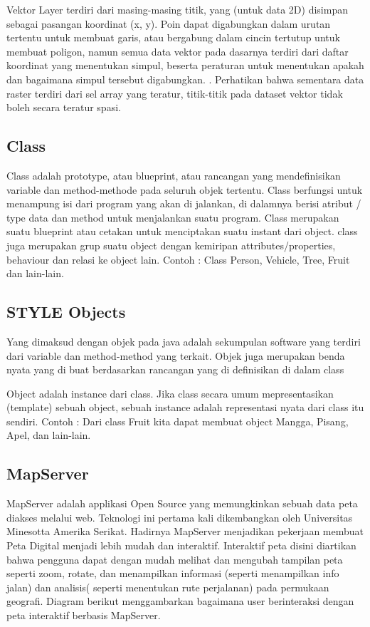 Vektor Layer terdiri dari masing-masing titik, yang (untuk data 2D) disimpan sebagai pasangan koordinat (x, y). 
Poin dapat digabungkan dalam urutan tertentu untuk membuat garis, atau bergabung dalam cincin tertutup untuk 
membuat poligon, namun semua data vektor pada dasarnya terdiri dari daftar koordinat yang menentukan simpul, 
beserta peraturan untuk menentukan apakah dan bagaimana simpul tersebut digabungkan. .
Perhatikan bahwa sementara data raster terdiri dari sel array yang teratur, 
titik-titik pada dataset vektor tidak boleh secara teratur spasi.

\subsection{Class}
Class adalah prototype, atau blueprint, atau rancangan yang mendefinisikan variable dan method-methode pada seluruh objek tertentu. 
Class berfungsi untuk menampung isi dari program yang akan di jalankan, di dalamnya berisi atribut / type data dan method untuk menjalankan suatu program.
Class merupakan suatu blueprint atau cetakan untuk menciptakan suatu instant dari  object. 
class juga merupakan grup suatu object dengan kemiripan attributes/properties, behaviour dan relasi ke object lain. 
Contoh : Class Person, Vehicle, Tree, Fruit dan lain-lain.

\subsection{STYLE Objects}
Yang dimaksud dengan objek pada java adalah sekumpulan software yang terdiri dari variable dan method-method yang terkait. 
Objek juga merupakan benda nyata yang di buat berdasarkan rancangan yang di definisikan di dalam class

Object adalah instance dari class. Jika class secara umum mepresentasikan (template) sebuah object, 
sebuah instance adalah representasi nyata dari class itu sendiri. Contoh : Dari class Fruit kita dapat membuat object Mangga, 
Pisang, Apel, dan lain-lain.

\subsection{MapServer}
MapServer adalah applikasi Open Source yang memungkinkan sebuah data peta diakses melalui web. Teknologi ini pertama kali dikembangkan oleh Universitas Minesotta Amerika Serikat. Hadirnya MapServer menjadikan pekerjaan membuat Peta Digital menjadi lebih mudah dan interaktif. Interaktif peta disini diartikan bahwa pengguna dapat dengan mudah melihat dan mengubah tampilan peta seperti zoom, rotate, dan menampilkan informasi (seperti menampilkan info jalan) dan analisis( seperti menentukan rute perjalanan) pada permukaan geografi. Diagram berikut menggambarkan bagaimana user berinteraksi dengan peta interaktif berbasis MapServer.
